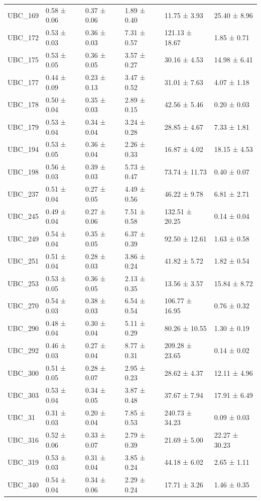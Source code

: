 \begin{tabular}{llllll}
UBC_169 & 0.58 ± 0.06 & 0.37 ± 0.06 & 1.89 ± 0.40 & 11.75 ± 3.93 & 25.40 ± 8.96 \\
UBC_172 & 0.53 ± 0.03 & 0.36 ± 0.03 & 7.31 ± 0.57 & 121.13 ± 18.67 & 1.85 ± 0.71 \\
UBC_175 & 0.53 ± 0.05 & 0.36 ± 0.05 & 3.57 ± 0.27 & 30.16 ± 4.53 & 14.98 ± 6.41 \\
UBC_177 & 0.44 ± 0.09 & 0.23 ± 0.13 & 3.47 ± 0.52 & 31.01 ± 7.63 & 4.07 ± 1.18 \\
UBC_178 & 0.50 ± 0.04 & 0.35 ± 0.03 & 2.89 ± 0.15 & 42.56 ± 5.46 & 0.20 ± 0.03 \\
UBC_179 & 0.53 ± 0.04 & 0.34 ± 0.04 & 3.24 ± 0.28 & 28.85 ± 4.67 & 7.33 ± 1.81 \\
UBC_194 & 0.53 ± 0.05 & 0.36 ± 0.04 & 2.26 ± 0.33 & 16.87 ± 4.02 & 18.15 ± 4.53 \\
UBC_198 & 0.56 ± 0.03 & 0.39 ± 0.03 & 5.73 ± 0.47 & 73.74 ± 11.73 & 0.40 ± 0.07 \\
UBC_237 & 0.51 ± 0.04 & 0.27 ± 0.05 & 4.49 ± 0.56 & 46.22 ± 9.78 & 6.81 ± 2.71 \\
UBC_245 & 0.49 ± 0.04 & 0.27 ± 0.06 & 7.51 ± 0.58 & 132.51 ± 20.25 & 0.14 ± 0.04 \\
UBC_249 & 0.54 ± 0.04 & 0.35 ± 0.05 & 6.37 ± 0.39 & 92.50 ± 12.61 & 1.63 ± 0.58 \\
UBC_251 & 0.51 ± 0.04 & 0.28 ± 0.03 & 3.86 ± 0.24 & 41.82 ± 5.72 & 1.82 ± 0.54 \\
UBC_253 & 0.53 ± 0.05 & 0.36 ± 0.05 & 2.13 ± 0.35 & 13.56 ± 3.57 & 15.84 ± 8.72 \\
UBC_270 & 0.54 ± 0.03 & 0.38 ± 0.03 & 6.54 ± 0.54 & 106.77 ± 16.95 & 0.76 ± 0.32 \\
UBC_290 & 0.48 ± 0.04 & 0.30 ± 0.04 & 5.11 ± 0.29 & 80.26 ± 10.55 & 1.30 ± 0.19 \\
UBC_292 & 0.46 ± 0.03 & 0.27 ± 0.04 & 8.77 ± 0.31 & 209.28 ± 23.65 & 0.14 ± 0.02 \\
UBC_300 & 0.51 ± 0.05 & 0.28 ± 0.07 & 2.95 ± 0.23 & 28.62 ± 4.37 & 12.11 ± 4.96 \\
UBC_303 & 0.53 ± 0.04 & 0.34 ± 0.05 & 3.87 ± 0.48 & 37.67 ± 7.94 & 17.91 ± 6.49 \\
UBC_31 & 0.31 ± 0.03 & 0.20 ± 0.04 & 7.85 ± 0.53 & 240.73 ± 34.23 & 0.09 ± 0.03 \\
UBC_316 & 0.52 ± 0.06 & 0.33 ± 0.07 & 2.79 ± 0.39 & 21.69 ± 5.00 & 22.27 ± 30.23 \\
UBC_319 & 0.53 ± 0.03 & 0.31 ± 0.04 & 3.85 ± 0.24 & 44.18 ± 6.02 & 2.65 ± 1.11 \\
UBC_340 & 0.54 ± 0.04 & 0.34 ± 0.06 & 2.29 ± 0.24 & 17.71 ± 3.26 & 1.46 ± 0.35 \\

\end{tabular}
